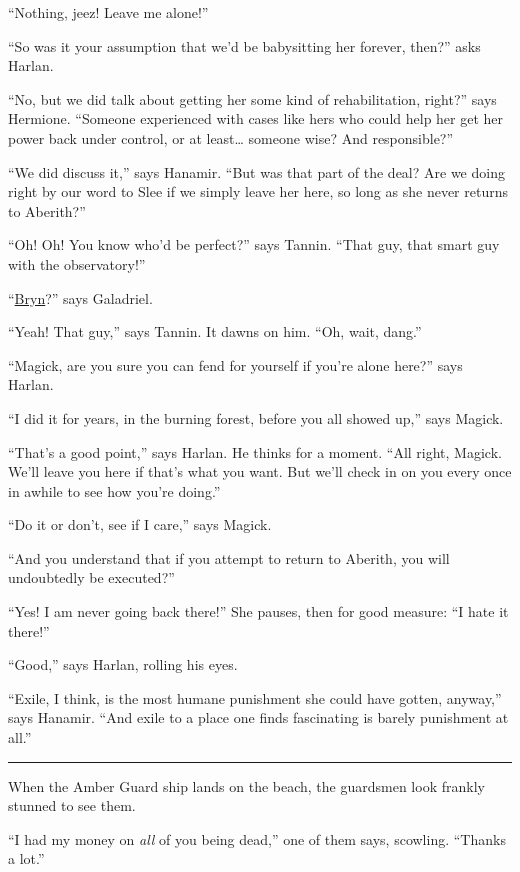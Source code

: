 \documentclass[smalldemyvopaper,11pt,twoside,onecolumn,openright,extrafontsizes]{memoir}
\begin{document}
``Nothing, jeez! Leave me alone!''

``So was it your assumption that we'd be babysitting her forever,
then?'' asks Harlan.

``No, but we did talk about getting her some kind of rehabilitation,
right?'' says Hermione. ``Someone experienced with cases like hers who
could help her get her power back under control, or at least\ldots{}
someone wise? And responsible?''

``We did discuss it,'' says Hanamir. ``But was that part of the deal?
Are we doing right by our word to Slee if we simply leave her here, so
long as she never returns to Aberith?''

``Oh! Oh! You know who'd be perfect?'' says Tannin. ``That guy, that
smart guy with the observatory!''

``\href{/characters/bryn/}{Bryn}?'' says Galadriel.

``Yeah! That guy,'' says Tannin. It dawns on him. ``Oh, wait, dang.''

``Magick, are you sure you can fend for yourself if you're alone here?''
says Harlan.

``I did it for years, in the burning forest, before you all showed up,''
says Magick.

``That's a good point,'' says Harlan. He thinks for a moment. ``All
right, Magick. We'll leave you here if that's what you want. But we'll
check in on you every once in awhile to see how you're doing.''

``Do it or don't, see if I care,'' says Magick.

``And you understand that if you attempt to return to Aberith, you will
undoubtedly be executed?''

``Yes! I am never going back there!'' She pauses, then for good measure:
``I hate it there!''

``Good,'' says Harlan, rolling his eyes.

``Exile, I think, is the most humane punishment she could have gotten,
anyway,'' says Hanamir. ``And exile to a place one finds fascinating is
barely punishment at all.''

\begin{center}\rule{0.5\linewidth}{\linethickness}\end{center}

When the Amber Guard ship lands on the beach, the guardsmen look frankly
stunned to see them.

``I had my money on \emph{all} of you being dead,'' one of them says,
scowling. ``Thanks a lot.''
\end{document}
